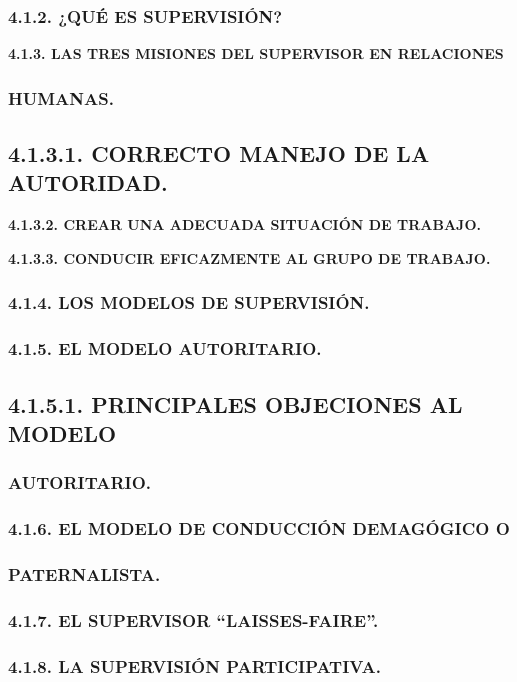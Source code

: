
\subsubsection*{4.1.2. ¿QUÉ ES SUPERVISIÓN?}
\textbf{4.1.3. LAS TRES MISIONES DEL SUPERVISOR EN RELACIONES}

\subsubsection*{HUMANAS.}
\subsection*{4.1.3.1. CORRECTO MANEJO DE LA AUTORIDAD.}
\textbf{4.1.3.2. CREAR UNA ADECUADA SITUACIÓN DE TRABAJO.}

\textbf{4.1.3.3. CONDUCIR EFICAZMENTE AL GRUPO DE TRABAJO.}

\subsubsection*{4.1.4. LOS MODELOS DE SUPERVISIÓN.}
\subsubsection*{4.1.5. EL MODELO AUTORITARIO.}
\subsection*{4.1.5.1. PRINCIPALES OBJECIONES AL MODELO}
\subsubsection*{AUTORITARIO.}
\subsubsection*{4.1.6. EL MODELO DE CONDUCCIÓN DEMAGÓGICO O}
\subsubsection*{PATERNALISTA.}
\subsubsection*{4.1.7. EL SUPERVISOR “LAISSES-FAIRE”.}
\subsubsection*{4.1.8. LA SUPERVISIÓN PARTICIPATIVA.}
